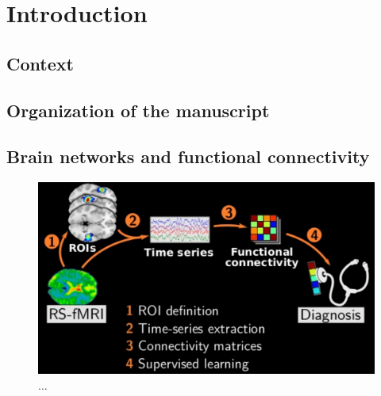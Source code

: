 
\chapter{Introduction}
\section{Context}
\section{Organization of the manuscript}

\section{Brain networks and functional connectivity}
\begin{figure}[!htbp]
  \includegraphics[width=1\linewidth]{figures/big_picture.png}
  \caption{...}
\end{figure}
